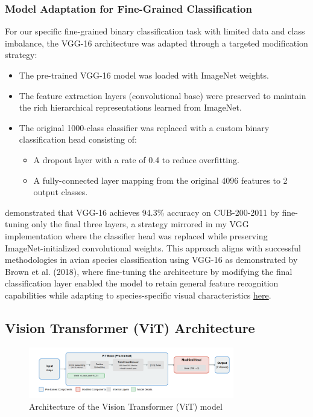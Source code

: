 \documentclass[a4paper,12pt]{report}
\begin{document}
\subsubsection{Model Adaptation for Fine-Grained Classification}

For our specific fine-grained binary classification task with limited data and class imbalance, the VGG-16 architecture was adapted through a targeted modification strategy:

\begin{itemize}
    \item The pre-trained VGG-16 model was loaded with ImageNet weights.
    \item The feature extraction layers (convolutional base) were preserved to maintain the rich hierarchical representations learned from ImageNet.
    \item The original 1000-class classifier was replaced with a custom binary classification head consisting of: 
    \begin{itemize}
        \item A dropout layer with a rate of 0.4 to reduce overfitting.
        \item A fully-connected layer mapping from the original 4096 features to 2 output classes.
    \end{itemize}
\end{itemize}

\citep{zhang2019bird} demonstrated that VGG-16 achieves 94.3\% accuracy on CUB-200-2011 by fine-tuning only the final three layers, a strategy mirrored in my VGG implementation where the classifier head was replaced while preserving ImageNet-initialized convolutional weights.
This approach aligns with successful methodologies in avian species classification using VGG-16 as demonstrated by Brown et al. (2018), where fine-tuning the architecture by modifying the final classification layer enabled the model to retain general feature recognition capabilities while adapting to species-specific visual characteristics \href{https://ieeexplore.ieee.org/stamp/stamp.jsp?tp=&arnumber=10533638&tag=}{here}.

\subsection{Vision Transformer (ViT) Architecture}

\begin{figure}[h]
    \centering
    \includegraphics[width=0.8\textwidth]{images/architecture/vit.png}
    \caption{Architecture of the Vision Transformer (ViT) model}
    \label{fig:vit_architecture}
\end{figure}
\end{document}

